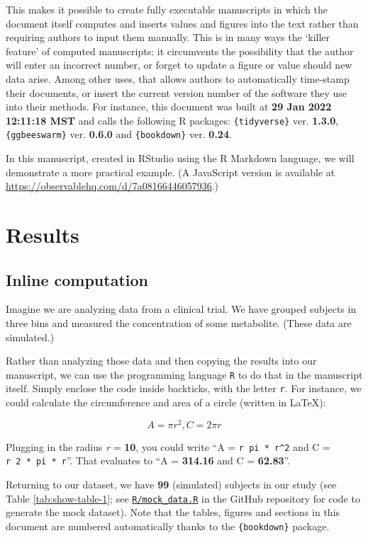 \documentclass[smallextended]{svjour3}       %
\begin{document}
This makes it possible to create fully executable manuscripts in which the document itself computes and inserts values and figures into the text rather than requiring authors to input them manually. This is in many ways the `killer feature' of computed manuscripts: it circumvents the possibility that the author will enter an incorrect number, or forget to update a figure or value should new data arise. Among other uses, that allows authors to automatically time-stamp their documents, or insert the current version number of the software they use into their methods. For instance, this document was built at \textbf{29 Jan 2022 12:11:18 MST} and calls the following R packages: \texttt{\{tidyverse\}} ver. \textbf{1.3.0}, \texttt{\{ggbeeswarm\}} ver. \textbf{0.6.0} and \texttt{\{bookdown\}} ver. \textbf{0.24}.

In this manuscript, created in RStudio using the R Markdown language, we will demonstrate a more practical example. (A JavaScript version is available at \url{https://observablehq.com/d/7a08166446057936}.)

\hypertarget{results}{%
\section{Results}\label{results}}

\hypertarget{sec:1}{%
\subsection{Inline computation}\label{sec:1}}

Imagine we are analyzing data from a clinical trial. We have grouped subjects in three bins and measured the concentration of some metabolite. (These data are simulated.)

Rather than analyzing those data and then copying the results into our manuscript, we can use the programming language \texttt{R} to do that in the manuscript itself. Simply enclose the code inside backticks, with the letter \texttt{r}. For instance, we could calculate the circumference and area of a circle (written in LaTeX):

\[A = \pi r^2, C = 2 \pi r\]

Plugging in the radius \emph{r} = \textbf{10}, you could write ``A = \texttt{\textasciigrave{}r\ pi\ *\ r\^{}2\textasciigrave{}} and C = \texttt{\textasciigrave{}r\ 2\ *\ pi\ *\ r\textasciigrave{}}''. That evaluates to ``A = \textbf{314.16} and C = \textbf{62.83}''.

Returning to our dataset, we have \textbf{99} (simulated) subjects in our study (see Table \ref{tab:show-table-1}; see \href{https://github.com/jperkel/computed_manuscript/blob/main/R/mock_data.R}{\texttt{R/mock\_data.R}} in the GitHub repository for code to generate the mock dataset). Note that the tables, figures and sections in this document are numbered automatically thanks to the \texttt{\{bookdown\}} package.
\end{document}
